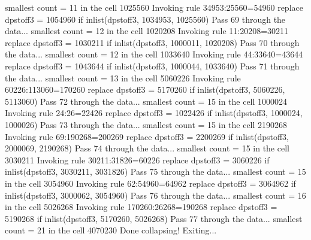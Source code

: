   smallest count = 11 in the cell      1025560
  Invoking rule 34953:25560=54960
  replace dpstoff3 = 1054960 if inlist(dpstoff3, 1034953, 1025560)
Pass 69 through the data...
  smallest count = 12 in the cell      1020208
  Invoking rule 11:20208=30211
  replace dpstoff3 = 1030211 if inlist(dpstoff3, 1000011, 1020208)
Pass 70 through the data...
  smallest count = 12 in the cell      1033640
  Invoking rule 44:33640=43644
  replace dpstoff3 = 1043644 if inlist(dpstoff3, 1000044, 1033640)
Pass 71 through the data...
  smallest count = 13 in the cell      5060226
  Invoking rule 60226:113060=170260
  replace dpstoff3 = 5170260 if inlist(dpstoff3, 5060226, 5113060)
Pass 72 through the data...
  smallest count = 15 in the cell      1000024
  Invoking rule 24:26=22426
  replace dpstoff3 = 1022426 if inlist(dpstoff3, 1000024, 1000026)
Pass 73 through the data...
  smallest count = 15 in the cell      2190268
  Invoking rule 69:190268=200269
  replace dpstoff3 = 2200269 if inlist(dpstoff3, 2000069, 2190268)
Pass 74 through the data...
  smallest count = 15 in the cell      3030211
  Invoking rule 30211:31826=60226
  replace dpstoff3 = 3060226 if inlist(dpstoff3, 3030211, 3031826)
Pass 75 through the data...
  smallest count = 15 in the cell      3054960
  Invoking rule 62:54960=64962
  replace dpstoff3 = 3064962 if inlist(dpstoff3, 3000062, 3054960)
Pass 76 through the data...
  smallest count = 16 in the cell      5026268
  Invoking rule 170260:26268=190268
  replace dpstoff3 = 5190268 if inlist(dpstoff3, 5170260, 5026268)
Pass 77 through the data...
  smallest count = 21 in the cell      4070230
  Done collapsing! Exiting...

